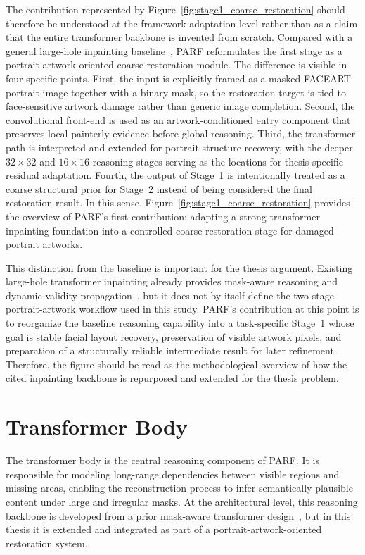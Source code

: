 \documentclass[12pt, twoside]{report}
\begin{document}
The contribution represented by Figure~\ref{fig:stage1_coarse_restoration} should therefore be understood at the framework-adaptation level rather than as a claim that the entire transformer backbone is invented from scratch. Compared with a general large-hole inpainting baseline~\cite{li2022mat}, PARF reformulates the first stage as a portrait-artwork-oriented coarse restoration module. The difference is visible in four specific points. First, the input is explicitly framed as a masked FACEART portrait image together with a binary mask, so the restoration target is tied to face-sensitive artwork damage rather than generic image completion. Second, the convolutional front-end is used as an artwork-conditioned entry component that preserves local painterly evidence before global reasoning. Third, the transformer path is interpreted and extended for portrait structure recovery, with the deeper $32\times32$ and $16\times16$ reasoning stages serving as the locations for thesis-specific residual adaptation. Fourth, the output of Stage~1 is intentionally treated as a coarse structural prior for Stage~2 instead of being considered the final restoration result. In this sense, Figure~\ref{fig:stage1_coarse_restoration} provides the overview of PARF's first contribution: adapting a strong transformer inpainting foundation into a controlled coarse-restoration stage for damaged portrait artworks.

This distinction from the baseline is important for the thesis argument. Existing large-hole transformer inpainting already provides mask-aware reasoning and dynamic validity propagation~\cite{li2022mat}, but it does not by itself define the two-stage portrait-artwork workflow used in this study. PARF's contribution at this point is to reorganize the baseline reasoning capability into a task-specific Stage~1 whose goal is stable facial layout recovery, preservation of visible artwork pixels, and preparation of a structurally reliable intermediate result for later refinement. Therefore, the figure should be read as the methodological overview of how the cited inpainting backbone is repurposed and extended for the thesis problem.

\section{Transformer Body}

The transformer body is the central reasoning component of PARF. It is responsible for modeling long-range dependencies between visible regions and missing areas, enabling the reconstruction process to infer semantically plausible content under large and irregular masks. At the architectural level, this reasoning backbone is developed from a prior mask-aware transformer design~\cite{li2022mat}, but in this thesis it is extended and integrated as part of a portrait-artwork-oriented restoration system.
\end{document}
